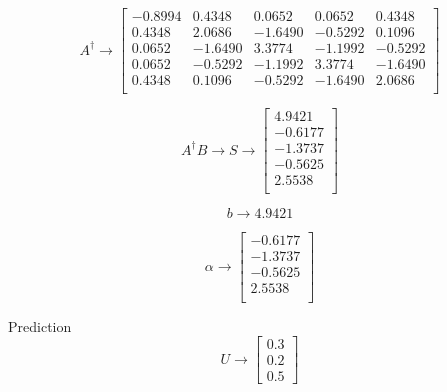 \begin{equation}
        A^{\dag}\to \begin{bmatrix}
                -0.8994 & 0.4348  & 0.0652  & 0.0652  & 0.4348  \\
                0.4348  & 2.0686  & -1.6490 & -0.5292 & 0.1096  \\
                0.0652  & -1.6490 & 3.3774  & -1.1992 & -0.5292 \\
                0.0652  & -0.5292 & -1.1992 & 3.3774  & -1.6490 \\
                0.4348  & 0.1096  & -0.5292 & -1.6490 & 2.0686  \\
        \end{bmatrix}
\end{equation}

\begin{equation}
        A^{\dag}B\to S\to \begin{bmatrix}
                4.9421  \\
                -0.6177 \\
                -1.3737 \\
                -0.5625 \\
                2.5538  \\
        \end{bmatrix}
\end{equation}

\begin{equation}
        b\to 4.9421
\end{equation}

\begin{equation}
        \alpha \to \begin{bmatrix}
                -0.6177 \\
                -1.3737 \\
                -0.5625 \\
                2.5538  \\
        \end{bmatrix}
\end{equation}

Prediction
\begin{equation}
        U\to \begin{bmatrix}
                0.3 \\
                0.2 \\
                0.5
        \end{bmatrix}
\end{equation}

